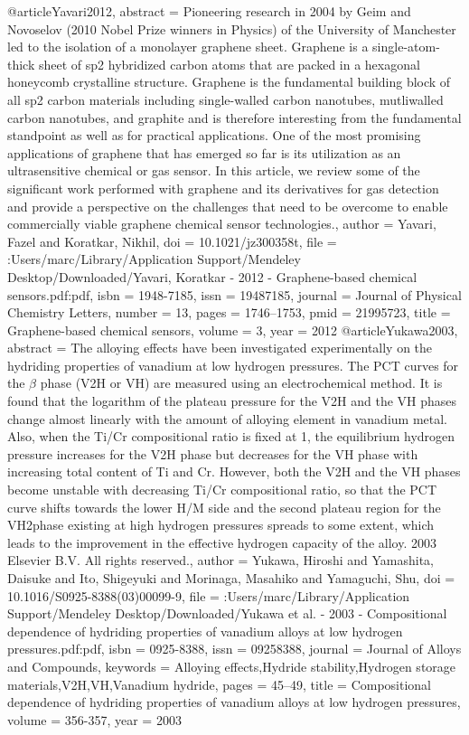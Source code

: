@article{Yavari2012,
abstract = {Pioneering research in 2004 by Geim and Novoselov (2010 Nobel Prize winners in Physics) of the University of Manchester led to the isolation of a monolayer graphene sheet. Graphene is a single-atom-thick sheet of sp2 hybridized carbon atoms that are packed in a hexagonal honeycomb crystalline structure. Graphene is the fundamental building block of all sp2 carbon materials including single-walled carbon nanotubes, mutliwalled carbon nanotubes, and graphite and is therefore interesting from the fundamental standpoint as well as for practical applications. One of the most promising applications of graphene that has emerged so far is its utilization as an ultrasensitive chemical or gas sensor. In this article, we review some of the significant work performed with graphene and its derivatives for gas detection and provide a perspective on the challenges that need to be overcome to enable commercially viable graphene chemical sensor technologies.},
author = {Yavari, Fazel and Koratkar, Nikhil},
doi = {10.1021/jz300358t},
file = {:Users/marc/Library/Application Support/Mendeley Desktop/Downloaded/Yavari, Koratkar - 2012 - Graphene-based chemical sensors.pdf:pdf},
isbn = {1948-7185},
issn = {19487185},
journal = {Journal of Physical Chemistry Letters},
number = {13},
pages = {1746--1753},
pmid = {21995723},
title = {{Graphene-based chemical sensors}},
volume = {3},
year = {2012}
}
@article{Yukawa2003,
abstract = {The alloying effects have been investigated experimentally on the hydriding properties of vanadium at low hydrogen pressures. The PCT curves for the $\beta$ phase (V2H or VH) are measured using an electrochemical method. It is found that the logarithm of the plateau pressure for the V2H and the VH phases change almost linearly with the amount of alloying element in vanadium metal. Also, when the Ti/Cr compositional ratio is fixed at 1, the equilibrium hydrogen pressure increases for the V2H phase but decreases for the VH phase with increasing total content of Ti and Cr. However, both the V2H and the VH phases become unstable with decreasing Ti/Cr compositional ratio, so that the PCT curve shifts towards the lower H/M side and the second plateau region for the VH2phase existing at high hydrogen pressures spreads to some extent, which leads to the improvement in the effective hydrogen capacity of the alloy. {\textcopyright} 2003 Elsevier B.V. All rights reserved.},
author = {Yukawa, Hiroshi and Yamashita, Daisuke and Ito, Shigeyuki and Morinaga, Masahiko and Yamaguchi, Shu},
doi = {10.1016/S0925-8388(03)00099-9},
file = {:Users/marc/Library/Application Support/Mendeley Desktop/Downloaded/Yukawa et al. - 2003 - Compositional dependence of hydriding properties of vanadium alloys at low hydrogen pressures.pdf:pdf},
isbn = {0925-8388},
issn = {09258388},
journal = {Journal of Alloys and Compounds},
keywords = {Alloying effects,Hydride stability,Hydrogen storage materials,V2H,VH,Vanadium hydride},
pages = {45--49},
title = {{Compositional dependence of hydriding properties of vanadium alloys at low hydrogen pressures}},
volume = {356-357},
year = {2003}
}
